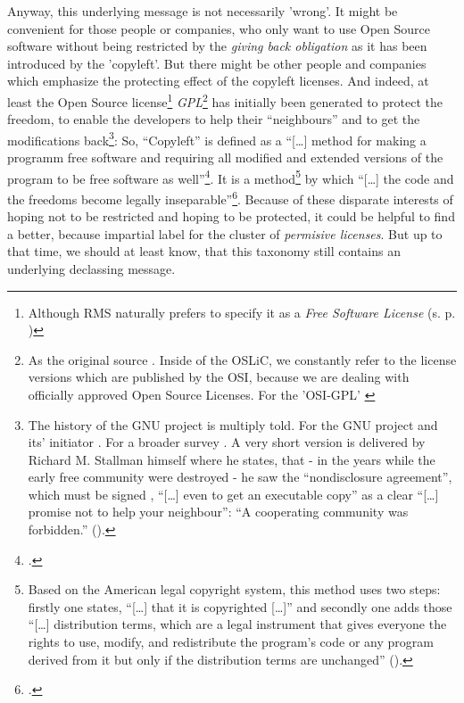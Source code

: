 Anyway, this underlying message is not necessarily 'wrong'. It might be
convenient for those people or companies, who only want to use Open Source
software without being restricted by the \emph{giving back obligation} as it has
been introduced by the 'copyleft'. But there might be other people and companies
which emphasize the protecting effect of the copyleft licenses. And indeed, at
least the Open Source license\footnote{Although RMS naturally prefers to specify
it as a \emph{Free Software License} (s. p. \pageref{RmsFsPriority}) }
\emph{GPL}\footnote{As the original source \cite[cf.][\nopage
wp]{Gpl20FsfLicense1991a}. Inside of the OSLiC, we constantly refer to the
license versions which are published by the OSI, because we are dealing with
officially approved Open Source Licenses. For the 'OSI-GPL' \cite[cf.][\nopage
wp]{Gpl20OsiLicense1991a}} has initially been generated to protect the freedom,
to enable the developers to help their \enquote{neighbours} and to get the
modifications back\footnote{The history of the GNU project is multiply told. For
the GNU project and its' initiator \cite[cf. pars pro toto][\nopage
passim]{Williams2002a}. For a broader survey \cite[cf. pars pro toto][\nopage
passim]{Moody2001a}. A very short version is delivered by Richard M.
Stallman himself where he states, that - in the years while the early free
community were destroyed - he saw the \enquote{nondisclosure agreement}, which
must be signed , \enquote{[\ldots] even to get an executable copy} as a clear
\enquote{[\ldots] promise not to help your neighbour}: \enquote{A cooperating
community was forbidden.} (\cite[cf.][16]{Stallman1999a}).}: So,
\enquote{Copyleft} is defined as a \enquote{[\ldots] method for making a
programm free software and requiring all modified and extended versions of the
program to be free software as well}\footcite[cf.][89]{Stallman1996c}. It is a
method\footnote{Based on the American legal copyright system, this method uses
two steps: firstly one states, \enquote{[\ldots] that it is copyrighted
[\ldots]} and secondly one adds those \enquote{[\ldots] distribution terms,
which are a legal instrument that gives everyone the rights to use, modify, and
redistribute the program's code or any program derived from it but only if the
distribution terms are unchanged} (\cite[cf.][89]{Stallman1996c}).} by which
\enquote{[\ldots] the code and the freedoms become legally
inseparable}\footcite[cf.][89]{Stallman1996c}. Because of these disparate
interests of hoping not to be restricted and hoping to be protected, it could be
helpful to find a better, because impartial label for the cluster of
\emph{permisive licenses}. But up to that time, we should at least know, that
this taxonomy still contains an underlying declassing message.

